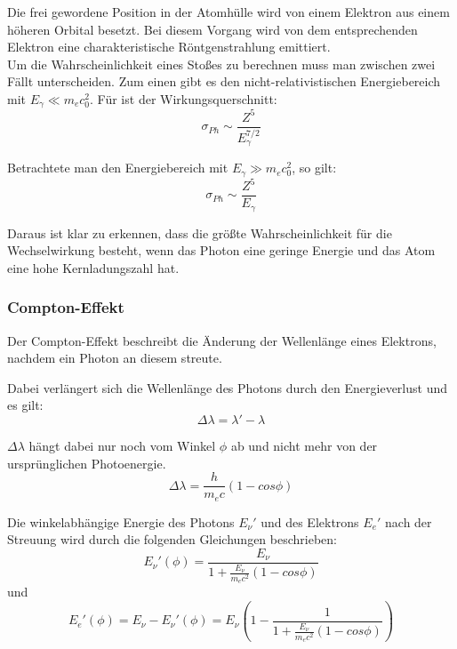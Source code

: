 Die frei gewordene Position in der Atomhülle wird von einem Elektron aus einem höheren Orbital besetzt. Bei diesem Vorgang wird von dem entsprechenden Elektron eine charakteristische Röntgenstrahlung emittiert.\\
Um die Wahrscheinlichkeit eines Stoßes zu berechnen muss man zwischen zwei Fällt unterscheiden. Zum einen gibt es den nicht-relativistischen Energiebereich mit $E_{\gamma}\ll m_{e}c_{0}^{2}$. Für ist der Wirkungsquerschnitt:
	\begin{equation}
	\sigma_{Ph} \sim \frac{Z^{5}}{E_{\gamma}^{7/2}}
	\end{equation}
	
Betrachtete man den Energiebereich mit $E_{\gamma} \gg m_{e}c_{0}^{2}$, so gilt:
	\begin{equation}
	\sigma_{Ph} \sim \frac{Z^{5}}{E_{\gamma}}
	\end{equation}
	
Daraus ist klar zu erkennen, dass die größte Wahrscheinlichkeit für die Wechselwirkung besteht, wenn das Photon eine geringe Energie und das Atom eine hohe Kernladungszahl hat.

\subsubsection*{Compton-Effekt}
Der Compton-Effekt beschreibt die Änderung der Wellenlänge eines Elektrons, nachdem ein Photon an diesem streute. 


Dabei verlängert sich die Wellenlänge des Photons durch den Energieverlust und es gilt:
	\begin{equation}
	\Delta \lambda = \lambda ' - \lambda
	\end{equation}

$\Delta \lambda$ hängt dabei nur noch vom Winkel $\phi$ ab und nicht mehr von der ursprünglichen Photoenergie.
	\begin{equation}
	\Delta \lambda = \frac{h}{m_{e} c}(1-cos \phi)
	\end{equation}

Die winkelabhängige Energie des Photons $E_{\nu}'$ und des Elektrons $E_{e}'$ nach der Streuung wird durch die folgenden Gleichungen beschrieben:
	\begin{equation}
	E_{\nu}'(\phi) = \frac{E_{\nu}}{1+\frac{E_{\nu}}{m_{e}c^{2}}(1-cos 			\phi)}
	\end{equation}
und
	\begin{equation}
	E_{e}'(\phi) = E_{\nu}-E_{\nu}'(\phi) = E_{\nu}\left(1-\frac{1}{1+\frac{E_{\nu}}{m_{e}c^{2}}(1-cos \phi)}\right)
	\end{equation}

